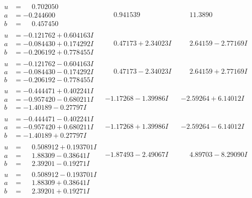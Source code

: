 \documentclass[1p]{elsarticle_modified}
\theoremstyle{definition}
\begin{document}
$$\begin{array}{c|c|c}
\begin{aligned}
u &= \phantom{-}0.702050\phantom{ +0.000000I} \\
a &= -0.244600\phantom{ +0.000000I} \\
b &= \phantom{-}0.457450\phantom{ +0.000000I}\end{aligned}
 & \phantom{-}0.941539\phantom{ +0.000000I} & \phantom{-}11.3890\phantom{ +0.000000I} \\ \hline\begin{aligned}
u &= -0.121762 + 0.604163 I \\
a &= -0.084430 + 0.174292 I \\
b &= -0.206192 + 0.778455 I\end{aligned}
 & \phantom{-}0.47173 + 2.34023 I & \phantom{-}2.64159 - 2.77169 I \\ \hline\begin{aligned}
u &= -0.121762 - 0.604163 I \\
a &= -0.084430 - 0.174292 I \\
b &= -0.206192 - 0.778455 I\end{aligned}
 & \phantom{-}0.47173 - 2.34023 I & \phantom{-}2.64159 + 2.77169 I \\ \hline\begin{aligned}
u &= -0.444471 + 0.402241 I \\
a &= -0.957420 - 0.680211 I \\
b &= -1.40189 - 0.27797 I\end{aligned}
 & -1.17268 - 1.39986 I & -2.59264 + 6.14012 I \\ \hline\begin{aligned}
u &= -0.444471 - 0.402241 I \\
a &= -0.957420 + 0.680211 I \\
b &= -1.40189 + 0.27797 I\end{aligned}
 & -1.17268 + 1.39986 I & -2.59264 - 6.14012 I \\ \hline\begin{aligned}
u &= \phantom{-}0.508912 + 0.193701 I \\
a &= \phantom{-}1.88309 - 0.38641 I \\
b &= \phantom{-}2.39201 - 0.19271 I\end{aligned}
 & -1.87493 - 2.49067 I & \phantom{-}4.89703 - 8.29090 I \\ \hline\begin{aligned}
u &= \phantom{-}0.508912 - 0.193701 I \\
a &= \phantom{-}1.88309 + 0.38641 I \\
b &= \phantom{-}2.39201 + 0.19271 I\end{aligned}

\end{array}$$
\end{document}
